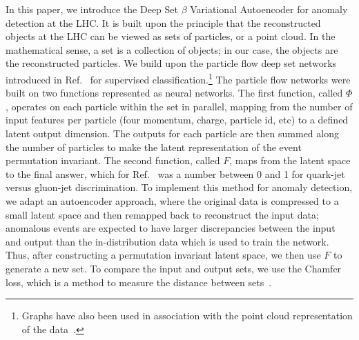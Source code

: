 \documentclass[submission, Phys]{SciPost}
\begin{document}
In this paper, we introduce the Deep Set $\beta$ Variational Autoencoder for anomaly detection at the LHC.
It is built upon the principle that the reconstructed objects at the LHC can be viewed as sets of particles, or a point cloud.
In the mathematical sense, a set is a collection of objects; in our case, the objects are the reconstructed particles.
We build upon the particle flow deep set networks introduced in Ref.~\cite{2019JHEP...01..121K} for supervised classification.\footnote{Graphs have also been used in association with the point cloud representation of the data~\cite{Qu:2019gqs}.}
The particle flow networks were built on two functions represented as neural networks.
The first function, called $\Phi$, operates on each particle within the set in parallel, mapping from the number of input features per particle (four momentum, charge, particle id, etc) to a defined latent output dimension.
The outputs for each particle are then summed along the number of particles to make the latent representation of the event permutation invariant.
The second function, called $F$, maps from the latent space to the final answer, which for Ref.~\cite{2019JHEP...01..121K} was a number between 0 and 1 for quark-jet versus gluon-jet discrimination.
To implement this method for anomaly detection, we adapt an autoencoder approach, where the original data is compressed to a small latent space and then remapped back to reconstruct the input data; anomalous events are expected to have larger discrepancies between the input and output than the in-distribution data which is used to train the network.
Thus, after constructing a permutation invariant latent space, we then use $F$ to generate a new set.
To compare the input and output sets, we use the Chamfer loss, which is a method to measure the distance between sets~\cite{2019arXiv190606565Z}.
\end{document}
